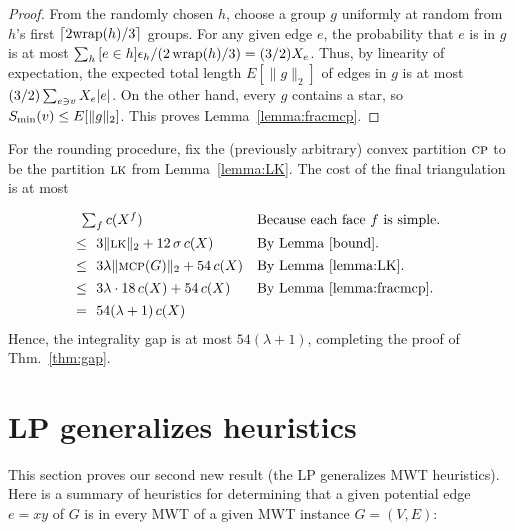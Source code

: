 \documentclass[final]{siamltex}
\newcommand{\transposal}[2]{{#1}^{#2}}
\newcommand{\LK}{\text{\sc lk}}
\newcommand{\MCP}{\text{\sc mcp}}
\newcommand{\cost}{c}
\newcommand{\edge}{e}
\newcommand{\edges}{E}
\newcommand{\face}{f}
\newcommand{\graph}{G}
\newcommand{\vertices}{V}
\newcommand{\fracTriang}{X}
\newcommand{\sensitivity}{\sigma}
\newcommand{\qed}{\endproof}
\begin{document}
\begin{proof}
  From the randomly chosen $h$, choose a group $g$ uniformly at random 
  from $h$'s first $\lceil 2 \text{wrap}(h)/3\rceil$ groups.
  For any given edge $\edge$, the probability that $\edge$ is in $g$ is at most
  $\sum_{h} \,[\edge \in h] \epsilon_h/ (2\,\wrap(h)/3) = (3/2) \fracTriang_\edge$.
  Thus, by linearity of expectation, the expected total length $E[\|g\|_2]$ of edges in $g$ 
  is at most $(3/2) \sum_{\edge\ni \vertex} \fracTriang_\edge|\edge|$.
  On the other hand, every $g$ contains a star, so $S_{\min}(v)  \le E[\|g\|_2]$.
  This proves Lemma~\ref{lemma:fracmcp}.
\end{proof}

For the rounding procedure,
fix the (previously arbitrary) convex partition $\text{\sc cp}$ 
to be the partition $\LK$ from Lemma~\ref{lemma:LK}.
The cost of the final triangulation is at most
\[
\setlength{\extrarowheight}{4pt}
\begin{array}{@{~}c@{~~}ll}
  \lefteqn{\textstyle \sum_\face \cost(\transposal{\fracTriang}{\face})} && \text{Because each face $\face$ is simple.}
\\\le & 3\|\LK\|_2 + 12\,\sensitivity\, \cost(\fracTriang)  & \text{By Lemma~\ref{bound}.}
\\\le & 3\lambda \|\MCP(\graph)\|_2 + 54\, \cost(\fracTriang) & \text{By Lemma~\ref{lemma:LK}.}
\\\le & 3\lambda \cdot 18\, \cost(\fracTriang) + 54\, \cost(\fracTriang) & \text{By Lemma~\ref{lemma:fracmcp}.}
\\= & 54(\lambda+1)\, \cost(\fracTriang) &
\end{array}
\]
Hence, the integrality gap is at most $54(\lambda+1)$,
completing the proof of Thm.~\ref{thm:gap}.
\qed





\section{LP generalizes heuristics}\label{sec:heuristics}

This section proves our second new result 
(the LP generalizes MWT heuristics).
Here is a summary of heuristics for determining that 
a given potential edge $\edge = xy$ of $\graph$ is in every MWT 
of a given MWT instance $\graph=(\vertices,\edges)$:

\newcommand{\thing}[2]{\smallskip \par\item[#1]{#2}}
\end{document}
